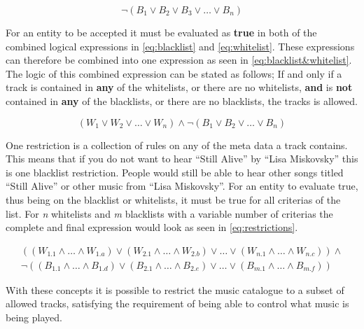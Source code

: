\begin{equation}
\label{eq:blacklist}
	\neg(B_1 \vee B_2 \vee B_3 \vee \dots \vee B_n)
\end{equation}

For an entity to be accepted it must be evaluated as \textbf{true} in both of the combined logical expressions in \cref{eq:blacklist} and \cref{eq:whitelist}. These expressions can therefore be combined into one expression as seen in \cref{eq:blacklist&whitelist}. The logic of this combined expression can be stated as follows; If and only if a track is contained in \textbf{any} of the whitelists, or there are no whitelists, \textbf{and} is \textbf{not} contained in \textbf{any} of the blacklists, or there are no blacklists, the tracks is allowed.

\begin{equation}
\label{eq:blacklist&whitelist}
		(W_1 \vee W_2 \vee \dots \vee W_n) \wedge \neg(B_1 \vee B_2 \vee \dots \vee B_n)
\end{equation}

One restriction is a collection of rules on any of the meta data a track contains. This means that if you do not want to hear \enquote{Still Alive} by \enquote{Lisa Miskovsky} this is one blacklist restriction. People would still be able to hear other songs titled \enquote{Still Alive} or other music from \enquote{Lisa Miskovsky}. For an entity to evaluate true, thus being on the blacklist or whitelists, it must be true for all criterias of the list. For \emph{n} whitelists and \emph{m} blacklists with a variable number of criterias the complete and final expression would look as seen in \cref{eq:restrictions}.

\begin{eqnarray}
	\label{eq:restrictions}
	((W_{1.1} \wedge \dots \wedge W_{1.a}) \vee (W_{2.1} \wedge \dots \wedge W_{2.b}) \vee \dots \vee (W_{n.1} \wedge \dots \wedge W_{n.c})) \wedge \nonumber \\ \neg((B_{1.1} \wedge \dots \wedge B_{1.d}) \vee (B_{2.1} \wedge \dots \wedge B_{2.e}) \vee \dots \vee (B_{m.1} \wedge \dots \wedge B_{m.f}))
\end{eqnarray}

With these concepts it is possible to restrict the music catalogue to a subset of allowed tracks, satisfying the requirement of being able to control what music is being played.

